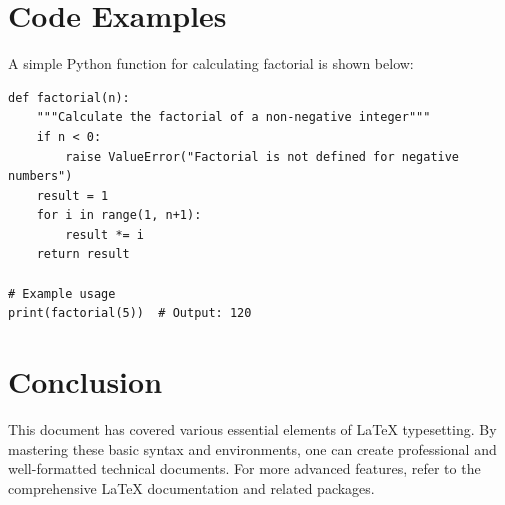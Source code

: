 \documentclass[12pt,a4paper]{article}
\begin{document}
\section{Code Examples}
\label{sec:code}

A simple Python function for calculating factorial is shown below:

\begin{lstlisting}
def factorial(n):
    """Calculate the factorial of a non-negative integer"""
    if n < 0:
        raise ValueError("Factorial is not defined for negative numbers")
    result = 1
    for i in range(1, n+1):
        result *= i
    return result

# Example usage
print(factorial(5))  # Output: 120
\end{lstlisting}

\section{Conclusion}
\label{sec:conclusion}

This document has covered various essential elements of LaTeX typesetting. By mastering these basic syntax and environments, one can create professional and well-formatted technical documents. For more advanced features, refer to the comprehensive LaTeX documentation and related packages.



\end{document}
